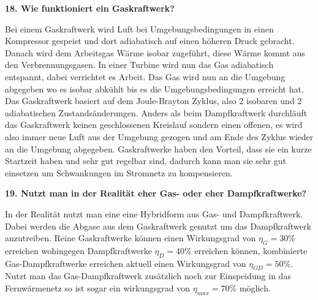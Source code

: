 \noindent \textbf{18. Wie funktioniert ein Gaskraftwerk?}\\
\begin{addmargin}[25pt]{0pt}
Bei einem Gaskraftwerk wird Luft bei Umgebungsbedingungen in einen Kompressor gespeist und dort adiabatisch auf einen höheren Druck gebracht. Danach wird dem Arbeitsgas Wärme isobar zugeführt, diese Wärme kommt aus den Verbrennungsgasen. In einer Turbine wird nun das Gas adiabatisch entspannt, dabei verrichtet es Arbeit. Das Gas wird nun an die Umgebung abgegeben wo es isobar abkühlt bis es die Umgebungsbedingungen erreicht hat. Das Gaskraftwerk basiert auf dem Joule-Brayton Zyklus, also 2 isobaren und 2 adiabatischen Zustandsänderungen. Anders als beim Dampfkraftwerk durchläuft das Gaskraftwerk keinen geschlossenen Kreislauf sondern einen offenen, es wird also immer neue Luft aus der Umgebung gezogen und am Ende des Zyklus wieder an die Umgebung abgegeben. Gaskraftwerke haben den Vorteil, dass sie ein kurze Startzeit haben und sehr gut regelbar sind, dadurch kann man sie sehr gut einsetzen um Schwankungen im Stromnetz zu kompensieren.\\
\end{addmargin}

\noindent \textbf{19. Nutzt man in der Realität eher Gas- oder eher Dampfkraftwerke?}\\
\begin{addmargin}[25pt]{0pt}
In der Realität nutzt man eine eine Hybridform aus Gas- und Dampfkraftwerk. Dabei werden die Abgase aus dem Gaskraftwerk genutzt um das Dampfkraftwerk anzutreiben. Reine Gaskraftwerke können einen Wirkungsgrad von $\eta_G = 30\%$ erreichen wohingegen Dampfkraftwerke $\eta_D = 40\% $ erreichen können, kombinierte Gas-Dampfkraftwerke erreichen aktuell einen Wirkungsgrad von $\eta_{GD} = 50\%$. Nutzt man das Gas-Dampfkraftwerk zusätzlich noch zur Einspeidung in das Fernwärmenetz so ist sogar ein wirkungsgrad von $\eta_{max} = 70\%$ möglich. \\
\end{addmargin}

